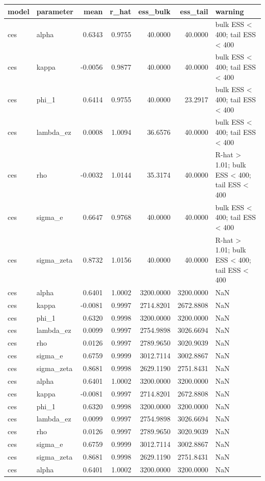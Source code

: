 \begin{tabular}{llrrrrl}
\toprule
model & parameter & mean & r\_hat & ess\_bulk & ess\_tail & warning \\
\midrule
ces & alpha & 0.6343 & 0.9755 & 40.0000 & 40.0000 & bulk ESS < 400; tail ESS < 400 \\
ces & kappa & -0.0056 & 0.9877 & 40.0000 & 40.0000 & bulk ESS < 400; tail ESS < 400 \\
ces & phi\_1 & 0.6414 & 0.9755 & 40.0000 & 23.2917 & bulk ESS < 400; tail ESS < 400 \\
ces & lambda\_ez & 0.0008 & 1.0094 & 36.6576 & 40.0000 & bulk ESS < 400; tail ESS < 400 \\
ces & rho & -0.0032 & 1.0144 & 35.3174 & 40.0000 & R-hat > 1.01; bulk ESS < 400; tail ESS < 400 \\
ces & sigma\_e & 0.6647 & 0.9768 & 40.0000 & 40.0000 & bulk ESS < 400; tail ESS < 400 \\
ces & sigma\_zeta & 0.8732 & 1.0156 & 40.0000 & 40.0000 & R-hat > 1.01; bulk ESS < 400; tail ESS < 400 \\
ces & alpha & 0.6401 & 1.0002 & 3200.0000 & 3200.0000 & NaN \\
ces & kappa & -0.0081 & 0.9997 & 2714.8201 & 2672.8808 & NaN \\
ces & phi\_1 & 0.6320 & 0.9998 & 3200.0000 & 3200.0000 & NaN \\
ces & lambda\_ez & 0.0099 & 0.9997 & 2754.9898 & 3026.6694 & NaN \\
ces & rho & 0.0126 & 0.9997 & 2789.9650 & 3020.9039 & NaN \\
ces & sigma\_e & 0.6759 & 0.9999 & 3012.7114 & 3002.8867 & NaN \\
ces & sigma\_zeta & 0.8681 & 0.9998 & 2629.1190 & 2751.8431 & NaN \\
ces & alpha & 0.6401 & 1.0002 & 3200.0000 & 3200.0000 & NaN \\
ces & kappa & -0.0081 & 0.9997 & 2714.8201 & 2672.8808 & NaN \\
ces & phi\_1 & 0.6320 & 0.9998 & 3200.0000 & 3200.0000 & NaN \\
ces & lambda\_ez & 0.0099 & 0.9997 & 2754.9898 & 3026.6694 & NaN \\
ces & rho & 0.0126 & 0.9997 & 2789.9650 & 3020.9039 & NaN \\
ces & sigma\_e & 0.6759 & 0.9999 & 3012.7114 & 3002.8867 & NaN \\
ces & sigma\_zeta & 0.8681 & 0.9998 & 2629.1190 & 2751.8431 & NaN \\
ces & alpha & 0.6401 & 1.0002 & 3200.0000 & 3200.0000 & NaN \\

\end{tabular}
